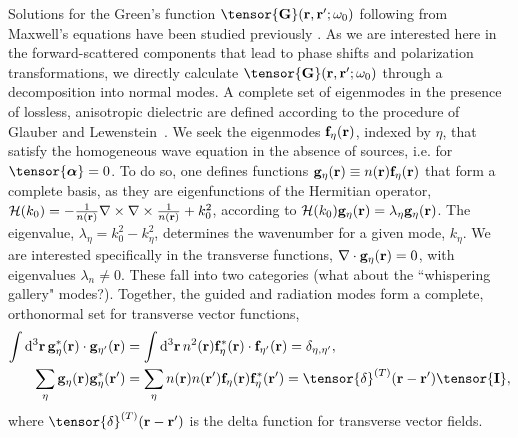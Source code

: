 \documentclass[preprint,aps,pra,onecolumn]{revtex4-1} %
\newcommand{\fidx}{\eta}
\newcommand{\unittens}{\tensor{\mathbf{I}}}
\newcommand{\eigenf}{\mbf{f}_\fidx}
\newcommand{\eigenfp}{\mbf{f}_{\fidx'}}
\newcommand{\eigeng}{\mbf{g}_\fidx}
\newcommand{\eigengp}{\mbf{g}_{\fidx'}}
\newcommand{\comment}[1]{{\color{Maroon} #1}}
\begin{document}
Solutions for the Green's function $\tensor{\mathbf{G}}(\br ,\br' ; \omega_0)$ following from Maxwell's equations 
have been studied previously \cite{sakoda_optical_1996,sondergaard_general_2001,wubs_multiple-scattering_2004}.  As we are interested here in the forward-scattered components that lead to phase shifts and polarization transformations, we directly calculate $\tensor{\mathbf{G}}(\br ,\br' ; \omega_0)$ through a decomposition into normal modes.  A complete set of eigenmodes in the presence of lossless, anisotropic dielectric are defined according to the procedure of Glauber and Lewenstein~\cite{glauber_quantum_1991}.  We seek the eigenmodes $\eigenf(\mathbf{r})$, indexed by $\fidx$, that satisfy the homogeneous wave equation in the absence of sources, i.e.  for $\tensor{\boldsymbol{\alpha}} = 0$.  To do so, one defines functions $\eigeng(\mbf{r}) \equiv n(\br) \eigenf(\mbf{r})$ that form a complete basis, as they are eigenfunctions of the Hermitian operator, $\mathcal{H}(k_0) = -\frac{1}{n(\mathbf{r})} \nabla\times\nabla\times \frac{1}{n(\mathbf{r})} + k_0^2$, according to $\mathcal{H}(k_0)  \eigeng(\mbf{r}) = \lambda_\fidx \eigeng(\mbf{r})$. The eigenvalue, $\lambda_\fidx= k_0^2-k_\fidx^2$, determines the wavenumber for a given mode, $k_\fidx$.  We are interested specifically in the transverse functions, $\nabla \cdot \eigeng(\br) = 0$, with eigenvalues $\lambda_n \neq 0$.  These fall into two categories \comment{(what about the ``whispering gallery" modes?)}.  
Together, the guided and radiation modes form a complete, orthonormal set for transverse vector functions,
	\begin{align}
	\int \mathrm{d}^3\br \, \eigeng^*(\mbf{r}) \cdot \eigengp(\mbf{r})  &= \int \mathrm{d}^3\br \, n^2(\br) \eigenf^* (\br)\cdot  \eigenfp(\br) =\delta_{\fidx, \fidx'},\label{Eq::Orthogonality}\\
	\sum_\fidx \eigeng(\br) \eigeng^*(\br') &= \sum_\fidx n(\br)n(\br') \eigenf(\br) \eigenf^*(\br') =\tensor{\delta}^{(T)}(\br-\br')  \unittens, \label{Eq::Completeness}
	\end{align}
where $\tensor{\delta}^{(T)}(\br-\br')$ is the delta function for transverse vector fields.  
\end{document}
